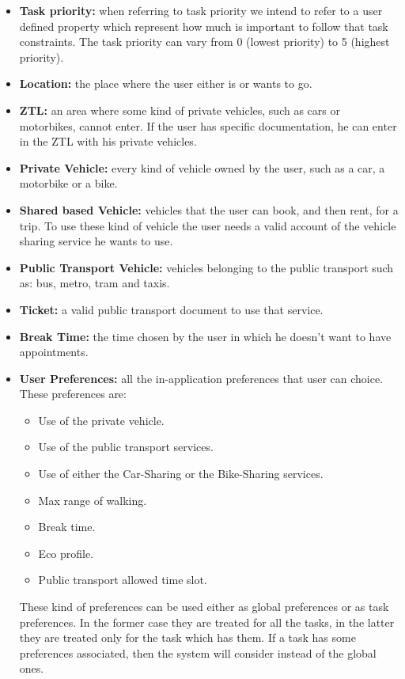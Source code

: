 \begin{itemize}
    \item \textbf{Task priority:} when referring to task priority we intend to refer to a user defined property which represent how much is important to follow that task constraints. The task priority can vary from 0 (lowest priority) to 5 (highest priority).
     
    \item \textbf{Location:} the place where the user either is or wants to go.
    
    \item \textbf{ZTL:} an area where some kind of private vehicles, such as cars or motorbikes, cannot enter. If the user has specific documentation, he can enter in the ZTL with his private vehicles.
    
    \item \textbf{Private Vehicle:} every kind of vehicle owned by the user, such as a car, a motorbike or a bike.
    
    \item \textbf{Shared based Vehicle:} vehicles that the user can book, and then rent, for a trip. To use these kind of vehicle the user needs a valid account of the vehicle sharing service he wants to use.
    
    \item \textbf{Public Transport Vehicle:} vehicles belonging to the public transport such as: bus, metro, tram and taxis.
        
    \item \textbf{Ticket:} a valid public transport document to use that service.
    
    \item \textbf{Break Time:} the time chosen by the user in which he doesn't want to have appointments.
    
    \item \textbf{User Preferences:} all the in-application preferences that user can choice. These preferences are: 
    \begin{itemize}
        \item Use of the private vehicle.
        \item Use of the public transport services.
        \item Use of either the Car-Sharing or the Bike-Sharing services.
        \item Max range of walking.
    	\item Break time.
    	\item Eco profile.
    	\item Public transport allowed time slot.
    \end{itemize}
    These kind of preferences can be used either as global preferences or as task preferences. In the former case they are treated for all the tasks, in the latter they are treated only for the task which has them.
    If a task has some preferences associated, then the system will consider instead of the global ones.
    

\end{itemize}
